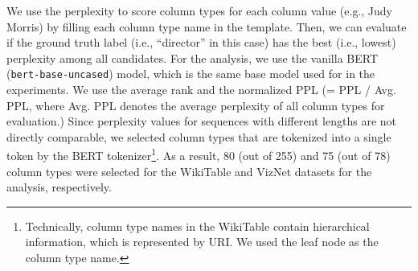 We use the perplexity to score column types for each column value (e.g., Judy Morris) by filling each column type name in the template. Then, we can evaluate if the ground truth label (i.e., ``director'' in this case) has the best (i.e., lowest) perplexity among all candidates. For the analysis, we use the vanilla BERT ({\tt bert-base-uncased}) model, which is the same base model used for \name{} in the experiments. 
%
We use the average rank and the normalized PPL (= PPL / Avg. PPL, where Avg. PPL denotes the average perplexity of all column types for evaluation.) 
%
Since perplexity values for sequences with different lengths are not directly comparable, we selected column types that are tokenized into a single token by the BERT tokenizer\footnote{Technically, column type names in the WikiTable contain hierarchical information, which is represented by URI. We used the leaf node as the column type name.}. As a result, 80 (out of 255) and 75 (out of 78) column types were selected for the WikiTable and VizNet datasets for the analysis, respectively.


